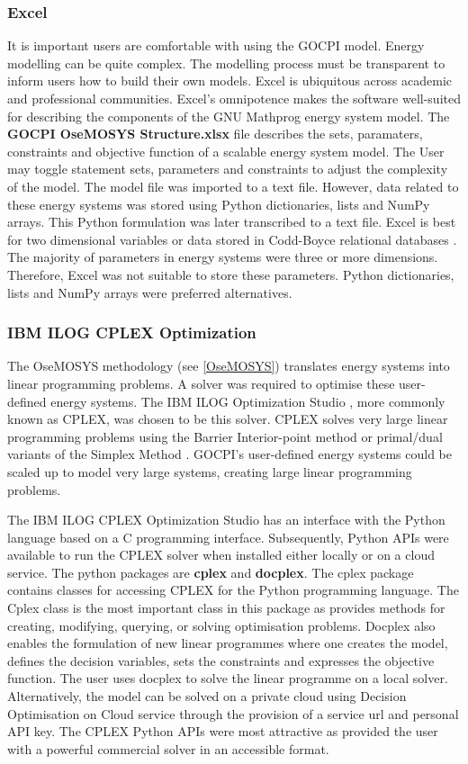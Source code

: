 \documentclass[10pt]{article}
\begin{document}
\subsubsection{Excel}
It is important users are comfortable with using the GOCPI model. 
Energy modelling can be quite complex. The modelling process must be transparent to inform users how to build their own models.
Excel is ubiquitous across academic and professional communities.
Excel's omnipotence makes the software well-suited for describing the components of the GNU Mathprog energy system model.
The \textbf{GOCPI OseMOSYS Structure.xlsx} file describes the sets, paramaters, constraints and objective function of a scalable energy system model.
The User may toggle statement sets, parameters and constraints to adjust the complexity of the model. 
The model file was imported to a text file.
However, data related to these energy systems was stored using Python dictionaries, lists and NumPy arrays.
This Python formulation was later transcribed to a text file.
Excel is best for two dimensional variables or data stored in Codd-Boyce relational databases \cite{CBNF}.
The majority of parameters in energy systems were three or more dimensions. 
Therefore, Excel was not suitable to store these parameters.
Python dictionaries, lists and NumPy arrays were preferred alternatives.

\subsubsection{IBM ILOG CPLEX Optimization}
The OseMOSYS methodology (see \ref{OseMOSYS}) translates energy systems into linear programming problems. 
A solver was required to optimise these user-defined energy systems.
The IBM ILOG Optimization Studio \cite{IBM_ILOG}, more commonly known as CPLEX, was chosen to be this solver.
CPLEX solves very large linear programming problems using the Barrier Interior-point method \cite{IPM} or primal/dual variants of the Simplex Method \cite{Simplex}.
GOCPI's user-defined energy systems could be scaled up to model very large systems, creating large linear programming problems.

The IBM ILOG CPLEX Optimization Studio has an interface with the Python language based on a C programming interface.
Subsequently, Python APIs were available to run the CPLEX solver when installed either locally or on a cloud service.
The python packages are \textbf{cplex} and \textbf{docplex}. The cplex package contains classes for accessing CPLEX for the Python programming language. 
The Cplex class is the most important class in this package as provides methods for creating, modifying, querying, or solving optimisation problems.
Docplex also enables the formulation of new linear programmes where one creates the model, defines the decision variables, sets the constraints and expresses the objective function.
The user uses docplex to solve the linear programme on a local solver. 
Alternatively, the model can be solved on a private cloud using Decision Optimisation on Cloud service through the provision of a service url and personal API key.
The CPLEX Python APIs were most attractive as provided the user with a powerful commercial solver in an accessible format.
\end{document}
